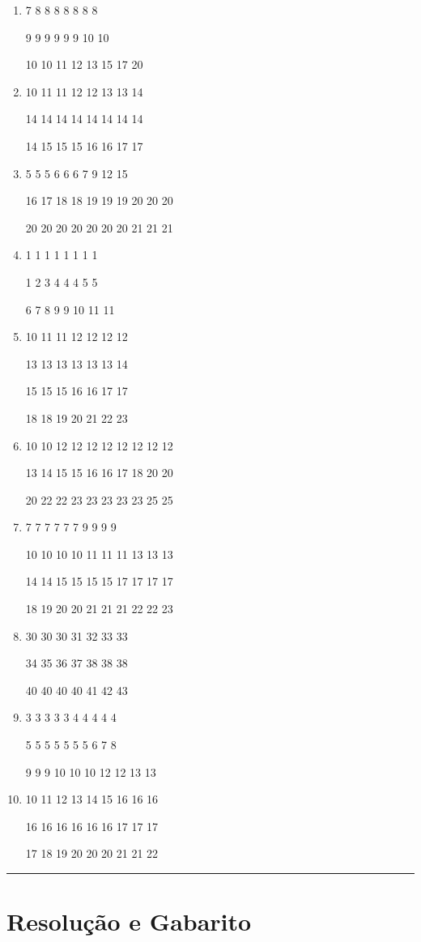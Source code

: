 \documentclass[]{book}
\begin{document}
\begin{enumerate}
\def\labelenumi{\alph{enumi})}
\item
  7 8 8 8 8 8 8 8

  9 9 9 9 9 9 10 10

  10 10 11 12 13 15 17 20
\item
  10 11 11 12 12 13 13 14

  14 14 14 14 14 14 14 14

  14 15 15 15 16 16 17 17
\item
  5 5 5 6 6 6 7 9 12 15

  16 17 18 18 19 19 19 20 20 20

  20 20 20 20 20 20 20 21 21 21
\item
  1 1 1 1 1 1 1 1

  1 2 3 4 4 4 5 5

  6 7 8 9 9 10 11 11
\item
  10 11 11 12 12 12 12

  13 13 13 13 13 13 14

  15 15 15 16 16 17 17

  18 18 19 20 21 22 23
\item
  10 10 12 12 12 12 12 12 12 12

  13 14 15 15 16 16 17 18 20 20

  20 22 22 23 23 23 23 23 25 25
\item
  7 7 7 7 7 7 9 9 9 9

  10 10 10 10 11 11 11 13 13 13

  14 14 15 15 15 15 17 17 17 17

  18 19 20 20 21 21 21 22 22 23
\item
  30 30 30 31 32 33 33

  34 35 36 37 38 38 38

  40 40 40 40 41 42 43
\item
  3 3 3 3 3 4 4 4 4 4

  5 5 5 5 5 5 5 6 7 8

  9 9 9 10 10 10 12 12 13 13
\item
  10 11 12 13 14 15 16 16 16

  16 16 16 16 16 16 17 17 17

  17 18 19 20 20 20 21 21 22
\end{enumerate}

\begin{center}\rule{0.5\linewidth}{\linethickness}\end{center}

\hypertarget{resolucao-e-gabarito}{%
\section{\texorpdfstring{\textbf{Resolução e Gabarito}}{Resolução e Gabarito}}\label{resolucao-e-gabarito}}
\end{document}
